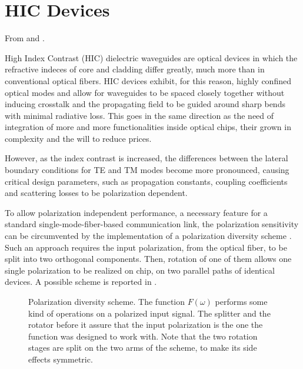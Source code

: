 
\section*{HIC Devices}

From \cite{watts_integrated} and \cite{exp_pirelli}.

High Index Contrast (HIC) dielectric waveguides are optical devices in
which the refractive indeces of core and cladding differ greatly,
much more than in conventional optical fibers. HIC devices exhibit,
for this reason, highly confined optical modes and allow for
waveguides to be spaced closely together without inducing crosstalk
and the propagating field to be guided around sharp bends with minimal
radiative loss. This goes in the same direction as the need of
integration of more and more functionalities inside optical chips, 
their grown in complexity and the will to reduce prices.

However, as the index contrast is increased, the differences between
the lateral boundary conditions for TE and TM modes become more
pronounced, causing critical design parameters, such as
propagation constants, coupling coefficients and scattering losses to
be polarization dependent.

To allow polarization independent performance, a necessary feature for
a standard single-mode-fiber-based communication link, the
polarization sensitivity can be circumvented by the implementation of
a polarization diversity scheme \cite{madsen_optical}. Such an
approach requires the input polarization, from the optical fiber, to
be split into two orthogonal components. Then, rotation of one of them
allows one single polarization to be realized on chip, on two parallel
paths of identical devices. A possible scheme is reported in
.

\begin{figure}[htbp]
  \begin{center}
    \resizebox{12cm}{!}{}
  \end{center}
  \caption{Polarization diversity scheme. The function $F(\omega)$
  performs some kind of operations on a polarized input signal. The
  splitter and the rotator before it assure that the input
  polarization is the one the function was designed to work with. Note
  that the two rotation stages are split on the two arms of the
  scheme, to make its side effects symmetric.}
  \label{fig:exp_fig1}
\end{figure}

